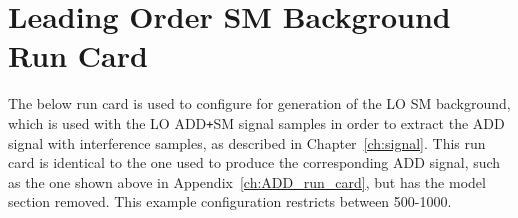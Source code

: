 

\pagebreak
\section{Leading Order SM Background Run Card}\label{ch:LO_SM_run_card}

The below run card is used to configure \SHERPA for generation of the LO SM background, which is used with the LO ADD\texttt{+}SM signal samples in order to extract the ADD signal with interference samples, as described in Chapter~\ref{ch:signal}. This run card is identical to the one used to produce the corresponding ADD signal, such as the one shown above in Appendix~\ref{ch:ADD_run_card}, but has the model section removed. This example configuration restricts \Mgg between 500-1000\GeV.

